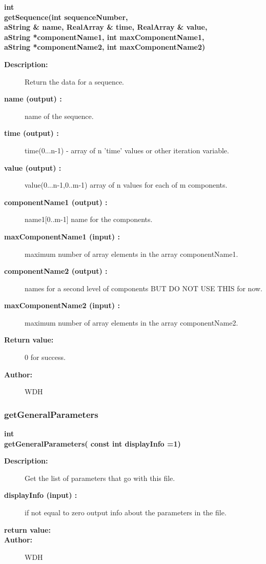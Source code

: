 \begin{flushleft} \textbf{%
int  \\ 
\settowidth{\ShowFileReaderIncludeArgIndent}{getSequence(}%
getSequence(int sequenceNumber,\\ 
\hspace{\ShowFileReaderIncludeArgIndent}aString \& name, RealArray \& time, RealArray \& value, \\ 
\hspace{\ShowFileReaderIncludeArgIndent}aString *componentName1, int maxComponentName1,\\ 
\hspace{\ShowFileReaderIncludeArgIndent}aString *componentName2, int maxComponentName2)
}\end{flushleft}
\begin{description}
\item[{\bf Description:}] 
     Return the data for a sequence.

\item[{\bf name (output) :}]  name of the sequence.
\item[{\bf time (output) :}]  time(0...n-1) - array of n 'time' values or other iteration variable.
\item[{\bf value (output) :}]  value(0...n-1,0..m-1) array of n values for each of m components.
\item[{\bf componentName1 (output) :}]  name1[0..m-1] name for the components.
\item[{\bf maxComponentName1 (input) :}]  maximum number of array elements in the array componentName1.
\item[{\bf componentName2 (output) :}]  names for a second level of components BUT DO NOT USE THIS for now.
\item[{\bf maxComponentName2 (input) :}]  maximum number of array elements in the array componentName2.

\item[{\bf Return value:}]  0 for success.
\item[{\bf Author:}]  WDH
\end{description}
\subsubsection{getGeneralParameters}
 
\begin{flushleft} \textbf{%
int  \\ 
\settowidth{\ShowFileReaderIncludeArgIndent}{getGeneralParameters(}%
getGeneralParameters( const int displayInfo  =1)
}\end{flushleft}
\begin{description}
\item[{\bf Description:}] 
    Get the list of parameters that go with this file.
\item[{\bf displayInfo (input) :}]  if not equal to zero output info about the parameters in the file.
\item[{\bf return value:}]  
\item[{\bf Author:}]  WDH
\end{description}
